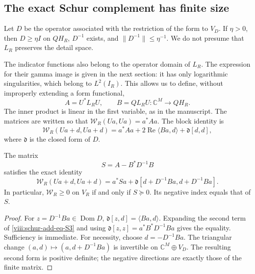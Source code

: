 \subsection{The exact Schur complement has finite size}
\label{viii:schur-add-sub-97}

Let \(D\) be the operator associated with the restriction of the form to \(V_D\).
If \(\eta>0\), then \(D\geq\eta I\) on \(QH_R\),
\(D^{-1}\) exists, and \(\|D^{-1}\|\leq\eta^{-1}\).
We do not presume that \(L_R\) preserves the detail space.

The indicator functions also belong to the operator domain of \(L_R\).
The expression for their gamma image is given in the next section: it has only
logarithmic singularities, which belong to \(L^2(I_R)\).
This allows us to define, without improperly extending a form functional,
\begin{equation}
A=U^*L_RU,\qquad B=QL_RU:\mathbb C^M\longrightarrow QH_R.
\label{viii:schur-add-display-6}
\end{equation}
The inner product is linear in the first variable, as in the
manuscript. The matrices are written so that
\(\mathscr W_R(Ua,Ua)=a^*Aa\). The block identity is
\begin{equation}
\mathscr W_R(Ua+d,Ua+d)
=a^*Aa+2\operatorname{Re}\langle Ba,d\rangle
+\mathfrak d[d,d],
\label{viii:schur-add-display-7}
\end{equation}
where \(\mathfrak d\) is the closed form of \(D\).

\begin{theorem}
\label{viii:schur-add-schur-exacto}
The matrix
\begin{equation}
S=A-B^*D^{-1}B
\label{viii:schur-add-eq-S2}
\end{equation}
satisfies the exact identity
\begin{equation}
\boxed{\mathscr W_R(Ua+d,Ua+d)
=a^*Sa+
\mathfrak d[d+D^{-1}Ba,d+D^{-1}Ba].}
\label{viii:schur-add-eq-S3}
\end{equation}
In particular, \(\mathscr W_R\geq0\) on \(V_R\) if and only if
\(S\succeq0\). Its negative index equals that of \(S\).
\end{theorem}
\begin{proof} For \(z=D^{-1}Ba\in\operatorname{Dom}D\),
\(\mathfrak d[z,d]=\langle Ba,d\rangle\). Expanding the second term
of \eqref{viii:schur-add-eq-S3} and using \(\mathfrak d[z,z]=a^*B^*D^{-1}Ba\) gives the equality.
Sufficiency is immediate. For necessity, choose
\(d=-D^{-1}Ba\). The triangular change \((a,d)\mapsto(a,d+D^{-1}Ba)\)
is invertible on \(\mathbb C^M\oplus V_D\). The resulting second form
is positive definite; the negative directions are exactly those of
the finite matrix.
\end{proof}

